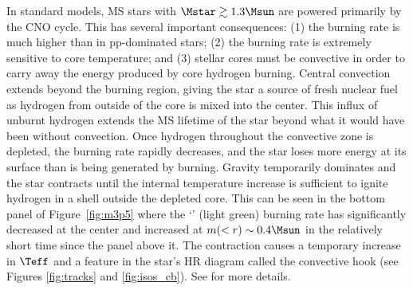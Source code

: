   In standard models, MS stars with $\Mstar \gtrsim 1.3 \Msun$ are powered primarily by the CNO cycle.
  This has several important consequences:
  (1) the burning rate is much higher than in pp-dominated stars;
  (2) the burning rate is extremely sensitive to core temperature;
  and (3) stellar cores must be convective in order to carry away the
  energy produced by core hydrogen burning.
  Central convection extends beyond the burning region,
  giving the star a source of fresh nuclear fuel as hydrogen from outside of the
  core is mixed into the center.
  This influx of unburnt hydrogen extends the MS lifetime of the star beyond what it would have been without convection.
  Once hydrogen throughout the convective zone is depleted, the burning rate rapidly decreases, and
  the star loses more energy at its surface than is being generated by burning.
  Gravity temporarily dominates and the star contracts until the
  internal temperature increase is sufficient to ignite hydrogen in a shell
  outside the depleted core.
  This can be seen in the bottom panel of Figure~\ref{fig:m3p5} where the `\nodm' (light green) burning rate has significantly decreased at the center and increased at $m(<r) \sim 0.4 \Msun$ in the relatively short time since the panel above it.
  The contraction causes a temporary increase in
  $\Teff$ and a feature in the star's HR diagram called the convective hook (see Figures \ref{fig:tracks} and \ref{fig:isos_cb}). 
  See \citet{Pols1990StellarEvolution} for more details.


